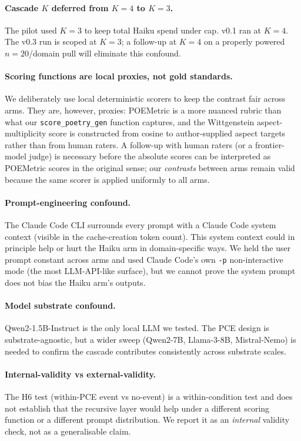 \paragraph{Cascade $K$ deferred from $K{=}4$ to $K{=}3$.} The pilot used $K{=}3$ to keep total Haiku spend under cap. v0.1 ran at $K{=}4$. The v0.3 run is scoped at $K{=}3$; a follow-up at $K{=}4$ on a properly powered $n{=}20$/domain pull will eliminate this confound.

\paragraph{Scoring functions are local proxies, not gold standards.} We deliberately use local deterministic scorers to keep the contrast fair across arms. They are, however, proxies: POEMetric is a more nuanced rubric than what our \texttt{score\_poetry\_gen} function captures, and the Wittgenstein aspect-multiplicity score is constructed from cosine to author-supplied aspect targets rather than from human raters. A follow-up with human raters (or a frontier-model judge) is necessary before the absolute scores can be interpreted as POEMetric scores in the original sense; our \emph{contrasts} between arms remain valid because the same scorer is applied uniformly to all arms.

\paragraph{Prompt-engineering confound.} The Claude Code CLI surrounds every prompt with a Claude Code system context (visible in the cache-creation token count). This system context could in principle help or hurt the Haiku arm in domain-specific ways. We held the user prompt constant across arms and used Claude Code's own \texttt{-p} non-interactive mode (the most LLM-API-like surface), but we cannot prove the system prompt does not bias the Haiku arm's outputs.

\paragraph{Model substrate confound.} Qwen2-1.5B-Instruct is the only local LLM we tested. The PCE design is substrate-agnostic, but a wider sweep (Qwen2-7B, Llama-3-8B, Mistral-Nemo) is needed to confirm the cascade contributes consistently across substrate scales.

\paragraph{Internal-validity vs external-validity.} The H6 test (within-PCE event vs no-event) is a within-condition test and does not establish that the recursive layer would help under a different scoring function or a different prompt distribution. We report it as an \emph{internal} validity check, not as a generalisable claim.

